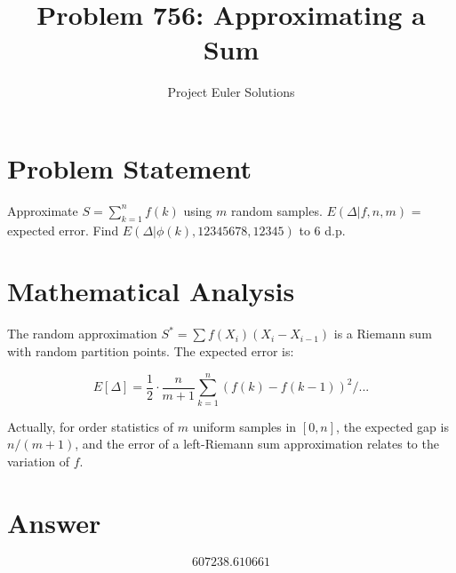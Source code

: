 \documentclass[11pt]{article}
\title{Problem 756: Approximating a Sum}
\author{Project Euler Solutions}
\date{}
\begin{document}
\maketitle


\section{Problem Statement}
Approximate $S = \sum_{{k=1}}^n f(k)$ using $m$ random samples. $E(\Delta|f,n,m)$ = expected error. Find $E(\Delta|\phi(k), 12345678, 12345)$ to 6 d.p.

\section{Mathematical Analysis}
The random approximation $S^* = \sum f(X_i)(X_i - X_{i-1})$ is a Riemann sum with random partition points. The expected error is:

$$E[\Delta] = \frac{1}{2} \cdot \frac{n}{m+1} \sum_{{k=1}}^n (f(k) - f(k-1))^2 / ... $$

Actually, for order statistics of $m$ uniform samples in $[0, n]$, the expected gap is $n/(m+1)$, and the error of a left-Riemann sum approximation relates to the variation of $f$.

\section{Answer}

\[
\boxed{607238.610661}
\]
\end{document}
